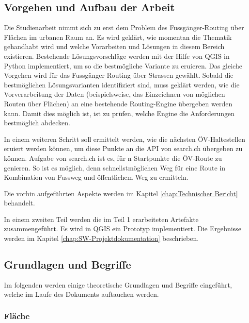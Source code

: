 \subsection{Vorgehen und Aufbau der Arbeit}
\label{Vorgehen und Aufbau der Arbeit}
Die Studienarbeit nimmt sich zu erst dem Problem des Fussgänger-Routing über Flächen im urbanen Raum an. Es wird geklärt, wie momentan die Thematik gehandhabt wird und welche Vorarbeiten und Lösungen in diesem Bereich existieren. Bestehende Lösungsvorschläge werden mit der Hilfe von QGIS in Python implementiert, um so die bestmögliche Variante zu eruieren. Das gleiche Vorgehen wird für das Fussgänger-Routing über Strassen gewählt. Sobald die bestmöglichen Lösungsvarianten identifiziert sind, muss geklärt werden, wie die Vorverarbeitung der Daten (beispielsweise, das Einzeichnen von möglichen Routen über Flächen) an eine bestehende Routing-Engine übergeben werden kann. Damit dies möglich ist, ist zu prüfen, welche Engine die Anforderungen bestmöglich abdecken.

In einem weiteren Schritt soll ermittelt werden, wie die nächsten ÖV-Haltestellen eruiert werden können, um diese Punkte an die API von search.ch übergeben zu können. Aufgabe von search.ch ist es, für n Startpunkte die ÖV-Route zu genieren. So ist es möglich, denn schnellstmöglichen Weg für eine Route in Kombination von Fussweg und öffentlichem Weg zu ermitteln.

Die vorhin aufgeführten Aspekte werden im Kapitel \ref{chap:Technischer Bericht} behandelt.

In einem zweiten Teil werden die im Teil 1 erarbeiteten Artefakte zusammengeführt. Es wird in QGIS ein Prototyp implementiert. Die Ergebnisse werden im Kapitel \ref{chap:SW-Projektdokumentation} beschrieben.




\subsection{Grundlagen und Begriffe}
\label{Grundlagen und Begriffe}

Im folgenden werden einige theoretische Grundlagen und Begriffe eingeführt, welche im Laufe des Dokuments auftauchen werden.



\subsubsection{Fläche}
\label{Fläche}

